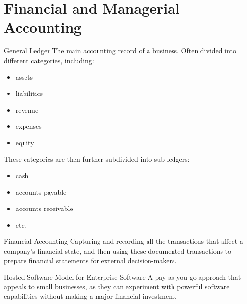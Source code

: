 \documentclass[\main/notes.tex]{subfiles}
\begin{document}
		\pagebreak
		\section{Financial and Managerial Accounting}
			\begin{definition}{General Ledger}
				The main accounting record of a business. Often divided into different categories, including:
				\begin{multicols}{2}
					\begin{itemize}[nosep]
						\item assets
						\item liabilities
						\item revenue
						\item expenses
						\item equity
					\end{itemize}
				\end{multicols}
				These categories are then further subdivided into sub-ledgers:
				\begin{multicols}{2}
					\begin{itemize}[nosep]
						\item cash
						\item accounts payable
						\item accounts receivable
						\item etc.
					\end{itemize}
				\end{multicols}
			\end{definition}
			\begin{definition}{Financial Accounting}
				Capturing and recording all the transactions that affect a company's financial state, and then using these documented transactions to prepare financial statements for external decision-makers.
			\end{definition}
			\begin{sidenote}{Hosted Software Model for Enterprise Software}
				A pay-as-you-go approach that appeals to small businesses, as they can experiment with powerful software capabilities without making a major financial investment.
			\end{sidenote}
	\vbox{}
\end{document}
